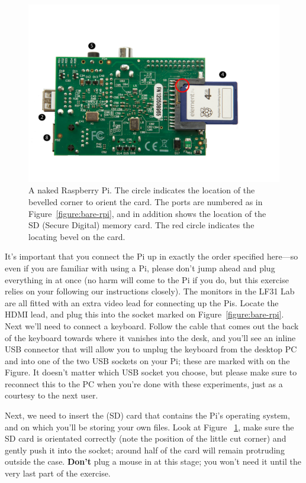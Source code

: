 \begin{figure}
\centerline{\includegraphics[width=15cm]{images/bare-rpi-underside-annotated}}
\caption{A naked Raspberry Pi. The circle indicates the location of the bevelled corner to orient the card. The ports are numbered as in Figure~\ref{figure:bare-rpi}, and in addition \protect{} shows the location of the SD (Secure Digital) memory card. The red circle indicates the locating bevel on the card.}\label{figure:bare-rpi-underside}
\end{figure}

It's important that you connect the Pi up in exactly the order specified here---so even if you are familiar with using a Pi, please don't jump ahead and plug everything in at once (no harm will come to the Pi if you do, but this exercise relies on your following our instructions closely). The monitors in the LF31 Lab are all fitted with an extra video lead for connecting up the Pis. Locate the HDMI lead, and plug this into the socket marked  on Figure~\ref{figure:bare-rpi}. Next we'll need to connect a keyboard. Follow the cable that comes out the back of the keyboard towards where it vanishes into the desk, and you'll see an inline USB connector that will allow you to unplug the keyboard from the desktop PC and into one of the two USB sockets on your Pi; these are marked with  on the Figure. It doesn't matter which USB socket you choose, but please make sure to reconnect this to the PC when you're done with these experiments, just as a courtesy to the next user. 

Next, we need to insert the  (SD) card that contains the Pi's operating system, and on which you'll be storing your own files. Look at Figure ~\ref{figure:bare-rpi-underside}, make sure the SD card is orientated correctly (note the position of the little cut corner) and gently push it into the socket; around half of the card will remain protruding outside the case. \textbf{Don't} plug a mouse in at this stage; you won't need it until the very last part of the exercise.


